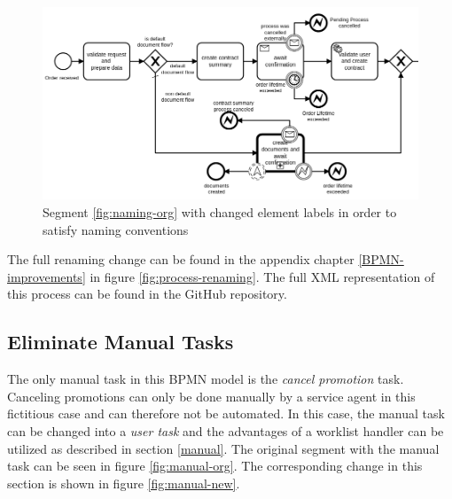 \begin{figure}[H]
	\centering
	\includegraphics[width=0.9\columnwidth]{graphics/case-study-naming-new}
	\caption{Segment \ref{fig:naming-org} with changed element labels in order to satisfy naming conventions}
	\label{fig:naming-new}
\end{figure}

The full renaming change can be found in the appendix chapter \ref{BPMN-improvements} in figure \ref{fig:process-renaming}. The full XML representation of this process can be found in the GitHub repository\cite{appendix-registration-2}.

\subsection{Eliminate Manual Tasks}
The only manual task in this BPMN model is the \textit{cancel promotion} task. Canceling promotions can only be done manually by a service agent in this fictitious case and can therefore not be automated. In this case, the manual task can be changed into a \textit{user task} and the advantages of a worklist handler can be utilized as described in section \ref{manual}.
The original segment with the manual task can be seen in figure \ref{fig:manual-org}. The corresponding change in this section is shown in figure \ref{fig:manual-new}. 


